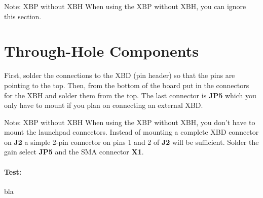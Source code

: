 \documentclass[twoside,11pt]{cergdoc}
\begin{document}
\begin{cergbox}{Note: XBP without XBH}
    When using the XBP without XBH, you can ignore this section. 
\end{cergbox}

\section{Through-Hole Components}

First, solder the connections to the XBD (pin header) so that the pins are pointing
to the top. Then, from the bottom of the board put in the connectors for the XBH
and solder them from the top. The last connector is \textbf{JP5} which you only
have to mount if you plan on connecting an external XBD. 

\begin{cergbox}{Note: XBP without XBH}
    When using the XBP without XBH, you don't have to mount the
    launchpad connectors. Instead of mounting a complete XBD connector
    on \textbf{J2} a simple 2-pin connector on pins 1 and 2 of \textbf{J2}
    will be sufficient. Solder the gain select \textbf{JP5} and the 
    SMA connector \textbf{X1}. 
\end{cergbox}

\paragraph{Test:} bla 
\end{document}
